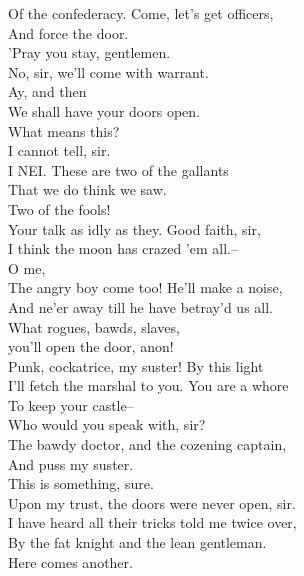 \documentclass{memoir}
\begin{document}
\begin{drama*}
 Of the confederacy. Come, let's get officers,\\
 And force the door.\\
\lovewitspeaks {} 'Pray you stay, gentlemen.\\
\surlyspeaks  No, sir, we'll come with warrant.\\
\mammonspeaks {} Ay, and then\\
 We shall have your doors open.\\
\lovewitspeaks {} What means this?\\
\facespeaks  I cannot tell, sir.\\
 I NEI. These are two of the gallants\\
 That we do think we saw.\\
\facespeaks {} Two of the fools!\\
 Your talk as idly as they. Good faith, sir,\\
 I think the moon has crazed 'em all.--\\
 O me,\\
 The angry boy come too! He'll make a noise,\\
 And ne'er away till he have betray'd us all.\\
\kastrilspeaks {} What rogues, bawds, slaves,\\
 you'll open the door, anon!\\
 Punk, cockatrice, my suster! By this light\\
 I'll fetch the marshal to you. You are a whore\\
 To keep your castle--\\
\facespeaks {} Who would you speak with, sir?\\
\kastrilspeaks  The bawdy doctor, and the cozening captain,\\
 And puss my suster.\\
\lovewitspeaks {} This is something, sure.\\
\facespeaks  Upon my trust, the doors were never open, sir.\\
\kastrilspeaks  I have heard all their tricks told me twice over,\\
 By the fat knight and the lean gentleman.\\
\lovewitspeaks  Here comes another.\\

\end{drama*}
\end{document}

